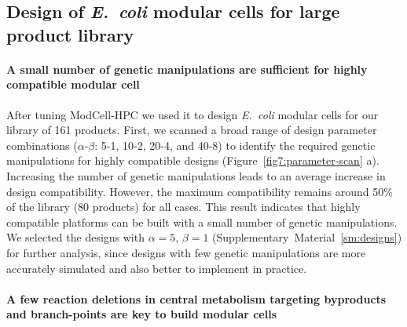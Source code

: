 \documentclass[12pt]{article}
\begin{document}
{\subsection{Design of \textit{E.~coli} modular cells for large product library}

\paragraph{A small number of genetic manipulations are sufficient for highly compatible modular cell}
After tuning ModCell-HPC we used it to design \textit{E.~coli} modular cells for our library of 161 products.
First, we scanned a broad range of design parameter combinations ($\alpha$-$\beta$: 5-1, 10-2, 20-4, and 40-8) to identify the required genetic manipulations for highly compatible designs (Figure~\ref{fig7:parameter-scan} a).
Increasing the number of genetic manipulations leads to an average increase in design compatibility.
However, the maximum compatibility remains around 50\% of the library (80 products) for all cases.
This result indicates that highly compatible platforms can be built with a small number of genetic manipulations.
We selected the designs with $\alpha=5$, $\beta=1$ (Supplementary~Material~\ref{sm:designs}) for further analysis, since designs with few genetic manipulations are more accurately simulated and also better to implement in practice.

\paragraph{A few reaction deletions in central metabolism targeting byproducts and branch-points are key to build modular cells}

}
\end{document}
